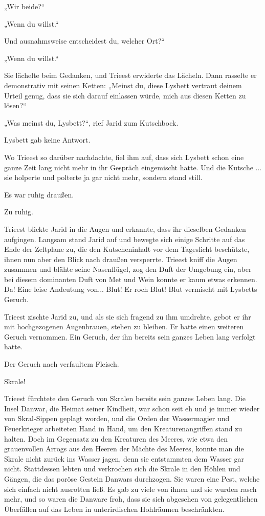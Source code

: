 „Wir beide?“

„Wenn du willst.“

Und ausnahmsweise entscheidest du, welcher Ort?“

„Wenn du willst.“

Sie lächelte beim Gedanken, und Trieest erwiderte das Lächeln. Dann rasselte er demonstrativ mit seinen Ketten: „Meinst du, diese Lysbett vertraut deinem Urteil genug, dass sie sich darauf einlassen würde, mich aus diesen Ketten zu lösen?“

„Was meinst du, Lysbett?“, rief Jarid zum Kutschbock.

Lysbett gab keine Antwort.

Wo Trieest so darüber nachdachte, fiel ihm auf, dass sich Lysbett schon eine ganze Zeit lang nicht mehr in ihr Gespräch eingemischt hatte. Und die Kutsche ... sie holperte und polterte ja gar nicht mehr, sondern stand still.

Es war ruhig draußen.

Zu ruhig.

Trieest blickte Jarid in die Augen und erkannte, dass ihr dieselben Gedanken aufgingen. Langsam stand Jarid auf und bewegte sich einige Schritte auf das Ende der Zeltplane zu, die den Kutscheninhalt vor dem Tageslicht beschützte, ihnen nun aber den Blick nach draußen versperrte. Trieest kniff die Augen zusammen und blähte seine Nasenflügel, zog den Duft der Umgebung ein, aber bei diesem dominanten Duft von Met und Wein konnte er kaum etwas erkennen. Da! Eine leise Andeutung von... Blut! Er roch Blut! Blut vermischt mit Lysbetts Geruch.

Trieest zischte Jarid zu, und als sie sich fragend zu ihm umdrehte, gebot er ihr mit hochgezogenen Augenbrauen, stehen zu bleiben. Er hatte einen weiteren Geruch vernommen. Ein Geruch, der ihn bereits sein ganzes Leben lang verfolgt hatte.

Der Geruch nach verfaultem Fleisch.

Skrale!



\trennzeichen



Trieest fürchtete den Geruch von Skralen bereits sein ganzes Leben lang. Die Insel Danwar, die Heimat seiner Kindheit, war schon seit eh und je immer wieder von Skral-Sippen geplagt worden, und die Orden der Wassermagier und Feuerkrieger arbeiteten Hand in Hand, um den Kreaturenangriffen stand zu halten. Doch im Gegensatz zu den Kreaturen des Meeres, wie etwa den grauenvollen Arrogs aus den Heeren der Mächte des Meeres, konnte man die Skrale nicht zurück ins Wasser jagen, denn sie entstammten dem Wasser gar nicht. Stattdessen lebten und verkrochen sich die Skrale in den Höhlen und Gängen, die das poröse Gestein Danwars durchzogen. Sie waren eine Pest, welche sich einfach nicht ausrotten ließ. Es gab zu viele von ihnen und sie wurden rasch mehr, und so waren die Danware froh, dass sie sich abgesehen von gelegentlichen Überfällen auf das Leben in unterirdischen Hohlräumen beschränkten.

